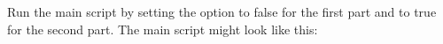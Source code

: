 
Run the main script by setting the option to false for the first part and to true for the second part.
The main script might look like this:
